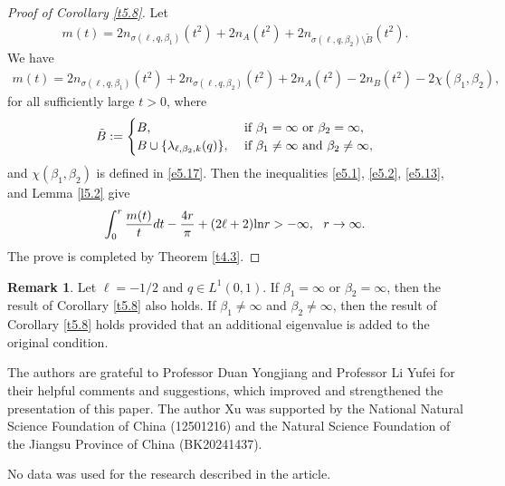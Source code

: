 \documentclass[reqno,12pt,centertags]{amsart}
\renewcommand{\ln}{\text{\rm ln}}
\numberwithin{equation}{section}
\theoremstyle{definition}
\newtheorem{remark}{Remark}[section]
\begin{document}
\begin{proof}[Proof of Corollary \ref{t5.8}]
Let 
\begin{align*}
m(t)
=2n_{\sigma(\ell, q, \beta_1)}(t^2)
+2n_A(t^2)
+2n_{\sigma(\ell, q, \beta_2)\setminus \tilde{B}}(t^2).
\end{align*}
We have
\begin{align}\label{e5.13}
m(t)
=2n_{\sigma(\ell, q, \beta_1)}(t^2)
+2n_{\sigma(\ell, q, \beta_2)}(t^2)
+2n_A(t^2)-2n_B(t^2)-2\chi(\beta_{1},\beta_{2}),
\end{align}
for all sufficiently large $t>0$,
where
\begin{align*}
\tilde{B}:=
\begin{cases}
B,
&~\textnormal{if}~\beta_{1}=\infty~\textnormal{or}~\beta_{2}=\infty,\\
B\cup\{\lambda_{\ell, \beta_{2}, k}(q)\},
&~\textnormal{if}~\beta_{1}\neq\infty~\textnormal{and}~\beta_{2}\neq\infty,
\end{cases}
\end{align*}
and $\chi(\beta_{1},\beta_{2})$ is defined in \eqref{e5.17}. 
Then the inequalities \eqref{e5.1}, \eqref{e5.2}, \eqref{e5.13}, and Lemma \ref{l5.2} give  
\begin{align*}
\int_{0}^{r}\frac{m(t)}{t}dt
-\frac{4r}{\pi}
+(2\ell+2)\ln r 
 >-\infty, 
~~r\rightarrow\infty.
\end{align*}
The prove is completed by Theorem \ref{t4.3}. 
\end{proof}

\begin{remark}\label{r5.5}
Let $\ell=-1/2$ and $q \in L^{1}(0,1)$. If $\beta_{1}=\infty$ or $\beta_{2}=\infty$, then the result of Corollary \ref{t5.8} also holds.
If $\beta_{1}\neq\infty$ and $\beta_{2}\neq\infty$, then the result of Corollary \ref{t5.8} holds provided that an additional eigenvalue is added to the original condition. 
\end{remark}

\bigskip

The authors are grateful to Professor Duan Yongjiang and Professor Li Yufei for their helpful comments and suggestions, which improved and strengthened the presentation of this paper.
The author Xu was supported by the National Natural Science Foundation of China (12501216) and the Natural Science Foundation of the Jiangsu Province of China (BK20241437).

\vskip 0.5cm
No data was used for the research described in the article.
\end{document}
